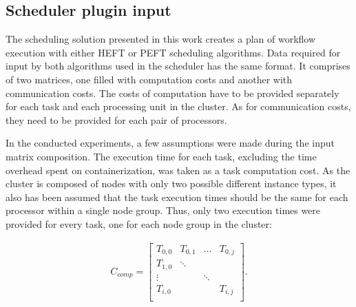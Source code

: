 \subsection{Scheduler plugin input}\label{s:ExperimentSetup:Input}



The scheduling solution presented in this work creates a plan of workflow execution with either HEFT or PEFT scheduling algorithms. 
Data required for input by both algorithms used in the scheduler has the same format.
It comprises of two matrices, one filled with computation costs and another with communication costs.
The costs of computation have to be provided separately for each task and each processing unit in the cluster.
As for communication costs, they need to be provided for each pair of processors.

In the conducted experiments, a few assumptions were made during the input matrix composition.
The execution time for each task, excluding the time overhead spent on containerization, was taken as a task computation cost.
As the cluster is composed of nodes with only two possible different instance types, it also has been assumed that the task execution times should be the same for each processor within a single node group.
Thus, only two execution times were provided for every task, one for each node group in the cluster:

\begin{align}
C_{comp}=
\begin{bmatrix}
T_{0, 0} & T_{0, 1} & \dots & T_{0, j}\\
T_{1, 0} & \ddots &  & \\
\vdots &  & \ddots & \\
T_{i, 0} &  &  & T_{i, j}\\
\end{bmatrix}.
\end{align}

